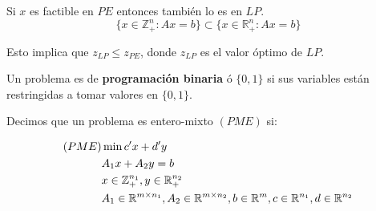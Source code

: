 \documentclass[PM.tex]{subfiles}
\begin{document}
\begin{obser}
Si $x$ es factible en $PE$ entonces también lo es en $LP$.
\[ \{x \in \mathbb{Z}_+^n : Ax=b \} \subset \{x \in \mathbb{R}_+^n : Ax=b \} \]

Esto implica que $z_{LP} ≤ z_{PE}$, donde $z_{LP} $ es el valor óptimo de $LP$.
\end{obser}
\begin{defi}
Un problema es de \textbf{programación binaria} ó $\{0,1\}$ si sus variables están restringidas a tomar valores en $\{0,1\}$.
\end{defi}
\newpage
\begin{defi}
Decimos que un problema es entero-mixto $(PME)$ si:

\begin{align*}
(PME) & \min c'x+d'y\\
	  & A_1 x + A_2 y = b\\
	  & x \in \mathbb{Z}_+^{n_1}, y \in \mathbb{R}_+^{n_2}\\
	  & A_1 \in \mathbb{R}^{m\times n_1}, A_2 \in \mathbb{R}^{m \times n_2}, b \in \mathbb{R}^m, c \in \mathbb{R}^{n_1}, d \in \mathbb{R}^{n_2}
\end{align*}
\end{defi}
\end{document}
